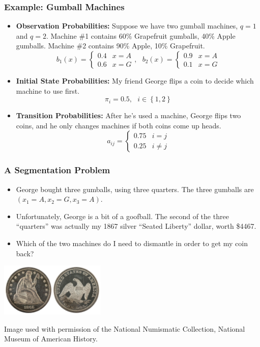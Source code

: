 \documentclass{beamer}
\begin{document}
\begin{frame}
  \frametitle{Example: Gumball Machines}
  \begin{itemize}
  \item {\bf Observation Probabilities:} Suppose we have two gumball
    machines, $q=1$ and $q=2$.  Machine \#1 contains 60\% Grapefruit
    gumballs, 40\% Apple gumballs.  Machine \#2 contains 90\%
    Apple, 10\% Grapefruit.
    \[
    b_1(x)=\begin{cases} 0.4 & x=A\\0.6 & x=G\end{cases},~~~
    b_2(x)=\begin{cases} 0.9 & x=A\\0.1 & x=G\end{cases}
    \]
  \item {\bf Initial State Probabilities:} My friend George flips a
    coin to decide which machine to use first.
    \[
    \pi_i = 0.5,~~~i\in\left\{1,2\right\}
    \]
  \item {\bf Transition Probabilities:} After he's used a machine,
    George flips two coins, and he only changes machines if both coins
    come up heads.
    \[
    a_{ij}=\begin{cases} 0.75 & i=j\\0.25 & i\ne j\end{cases}
    \]
  \end{itemize}
\end{frame}

\begin{frame}
  \frametitle{A Segmentation Problem}

  \begin{itemize}
  \item George bought three gumballs, using three quarters.  The three
    gumballs are $(x_1=A,x_2=G,x_3=A)$.
  \item Unfortunately, George is a bit of a goofball.  The second of
    the three ``quarters'' was actually my 1867 silver ``Seated
    Liberty'' dollar, worth \$4467.
  \item Which of the two machines do I need to dismantle in order to
    get my coin back?
  \end{itemize}
  \centerline{\includegraphics[height=1in]{seatedlibertydollar.jpg}}
  \begin{tiny}Image used with permission of the National Numismatic Collection, National Museum of American History.\end{tiny}
\end{frame}
\end{document}
